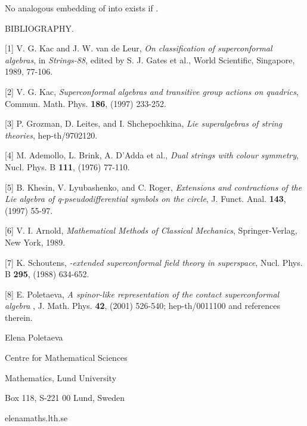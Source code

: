 \documentclass[a4paper,a4paper]{article}
\begin{document}
No analogous embedding of  \coordHE{} into \coordHE{}
exists if \coordHE{}.

\vskip 0.2in


BIBLIOGRAPHY.

\vskip 0.1in

[1] V. G. Kac and J. W. van de Leur,
{\it On classification of superconformal algebras}, 
in {\it Strings-88}, edited by S. J. Gates  et al.,
World Scientific, Singapore, 1989,  77-106.

[2] V. G. Kac,
{\it Superconformal algebras and transitive group actions on quadrics},
Commun. Math. Phys. {\bf 186}, (1997) 233-252.

[3] P. Grozman, D. Leites, and I. Shchepochkina,
{\it Lie superalgebras of string theories},
hep-th/9702120.

[4] M. Ademollo, L. Brink, A. D'Adda  et al.,
{\it Dual strings with \coordHE{} colour symmetry}, 
Nucl. Phys. B {\bf 111}, (1976) 77-110.

[5] B. Khesin, V. Lyubashenko, and C. Roger,
{\it Extensions and contractions of the Lie algebra of
q-pseudodifferential symbols on the circle},
J. Funct. Anal. {\bf 143}, (1997) 55-97.

[6]  V. I. Arnold, 
{\it Mathematical Methods of Classical Mechanics},
Springer-Verlag, New York, 1989.

[7] K. Schoutens,
{\it {}\coordHE{}-extended
superconformal field theory in superspace},
Nucl. Phys. B {\bf 295}, (1988) 634-652.

[8] E. Poletaeva,
{\it A spinor-like representation of the contact
superconformal algebra  \coordHE{}}, 
J. Math. Phys. {\bf 42}, (2001) 526-540; hep-th/0011100
and references therein.

\vskip 0.1in

Elena Poletaeva

Centre for Mathematical Sciences

Mathematics, Lund University

Box 118, S-221 00 Lund, Sweden

elena\coordHE{}maths.lth.se
\end{document}
